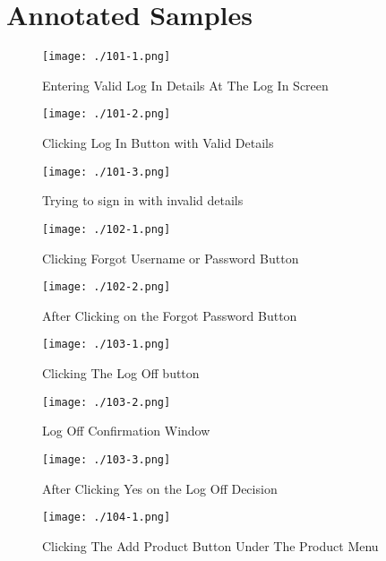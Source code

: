 \section{Annotated Samples}

\begin{figure}[H]
    \texttt{[image: ./101-1.png]}
    \caption{Entering Valid Log In Details At The Log In Screen} \label{fig:valid_log_in_details}
\end{figure}

\begin{figure}[H]
    \texttt{[image: ./101-2.png]}
    \caption{Clicking Log In Button with Valid Details} \label{fig:log_in_clicked}
\end{figure}

\begin{figure}[H]
    \texttt{[image: ./101-3.png]}
    \caption{Trying to sign in with invalid details} \label{fig:invalid_log_in}
\end{figure}

\begin{figure}[H]
    \texttt{[image: ./102-1.png]}
    \caption{Clicking Forgot Username or Password Button} \label{fig:forgot_details}
\end{figure}

\begin{figure}[H]
    \texttt{[image: ./102-2.png]}
    \caption{After Clicking on the Forgot Password Button } \label{fig:forgot_password_interface}
\end{figure}

\begin{figure}[H]
    \texttt{[image: ./103-1.png]}
    \caption{Clicking The Log Off button} \label{fig:log_off_click}
\end{figure}

\begin{figure}[H]
    \texttt{[image: ./103-2.png]}
    \caption{Log Off Confirmation Window} \label{fig:log_off_confirmation}
\end{figure}

\begin{figure}[H]
    \texttt{[image: ./103-3.png]}
    \caption{After Clicking Yes on the Log Off Decision} \label{fig:log_off_success}
\end{figure}

\begin{figure}[H]
    \texttt{[image: ./104-1.png]}
    \caption{Clicking The Add Product Button Under The Product Menu} \label{fig:click_add_product}
\end{figure}


